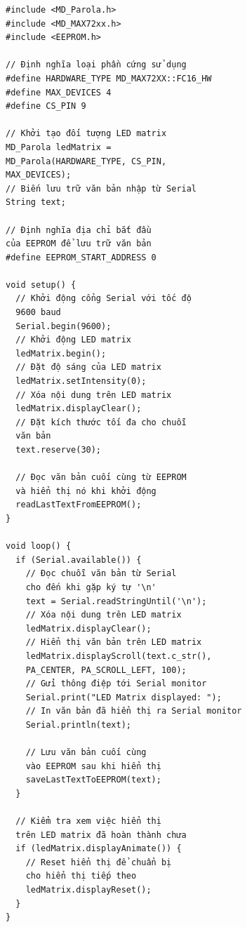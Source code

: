 \documentclass[conference]{IEEEtran}
\begin{document}
\begin{verbatim}
#include <MD_Parola.h>
#include <MD_MAX72xx.h>
#include <EEPROM.h>

// Định nghĩa loại phần cứng sử dụng
#define HARDWARE_TYPE MD_MAX72XX::FC16_HW  
#define MAX_DEVICES 4
#define CS_PIN 9

// Khởi tạo đối tượng LED matrix
MD_Parola ledMatrix = 
MD_Parola(HARDWARE_TYPE, CS_PIN, 
MAX_DEVICES);  
// Biến lưu trữ văn bản nhập từ Serial 
String text;                                                           

// Định nghĩa địa chỉ bắt đầu 
của EEPROM để lưu trữ văn bản
#define EEPROM_START_ADDRESS 0

void setup() {
  // Khởi động cổng Serial với tốc độ 
  9600 baud
  Serial.begin(9600);   
  // Khởi động LED matrix
  ledMatrix.begin();         
  // Đặt độ sáng của LED matrix
  ledMatrix.setIntensity(0);  
  // Xóa nội dung trên LED matrix
  ledMatrix.displayClear();   
  // Đặt kích thước tối đa cho chuỗi 
  văn bản
  text.reserve(30);           

  // Đọc văn bản cuối cùng từ EEPROM 
  và hiển thị nó khi khởi động
  readLastTextFromEEPROM();
}

void loop() {
  if (Serial.available()) {
    // Đọc chuỗi văn bản từ Serial 
    cho đến khi gặp ký tự '\n'
    text = Serial.readStringUntil('\n');           
    // Xóa nội dung trên LED matrix
    ledMatrix.displayClear();   
    // Hiển thị văn bản trên LED matrix
    ledMatrix.displayScroll(text.c_str(), 
    PA_CENTER, PA_SCROLL_LEFT, 100);  
    // Gửi thông điệp tới Serial monitor
    Serial.print("LED Matrix displayed: ");         
    // In văn bản đã hiển thị ra Serial monitor
    Serial.println(text);                           

    // Lưu văn bản cuối cùng 
    vào EEPROM sau khi hiển thị
    saveLastTextToEEPROM(text);
  }
  
  // Kiểm tra xem việc hiển thị 
  trên LED matrix đã hoàn thành chưa
  if (ledMatrix.displayAnimate()) {  
    // Reset hiển thị để chuẩn bị 
    cho hiển thị tiếp theo
    ledMatrix.displayReset();        
  }
}


\end{verbatim}
\end{document}
